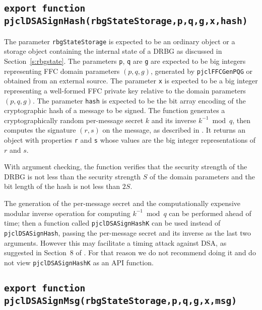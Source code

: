 \documentclass[12pt]{article}
\begin{document}
\subsection{\tt export function pjclDSASignHash(rbgStateStorage,p,q,g,x,hash)}

The parameter {\tt rbgStateStorage} is expected to be an ordinary
object or a storage object containing the internal state of a DRBG 
as discussed in Section~\ref{s:rbgstate}.
The parameters {\tt p}, {\tt q} are {\tt g}
are expected to be big integers representing FFC domain parameters $(p,q,g)$,
generated by {\tt pjclFFCGenPQG} or obtained from an external source.
The parameter {\tt x} is expected to be a big integer representing a 
well-formed FFC private key relative to the domain parameters $(p,q,g)$.
The parameter {\tt hash} is expected to be the bit array encoding of the
cryptographic hash of a message to be signed.  The function 
generates a cryptographically random per-message secret $k$ and its inverse $k^{-1} \bmod q$, then
computes the signature $(r,s)$ on the message,
as described in \cite[Section~4.6]{DSS-4}.
It returns an object
with properties {\tt r} and {\tt s} whose values are the big integer representations 
of $r$ and $s$.

With argument checking, the function verifies that the security strength of the DRBG
is not less than the security strength $S$ of the domain parameters and the 
bit length of the hash is not less than $2S$.

The generation of the per-message secret and 
the computationally expensive modular inverse operation for computing 
$k^{-1} \bmod q$ can be performed ahead of time; then a function called
{\tt pjclDSASignHashK} can be used instead of {\tt pjclDSASignHash},
passing the per-message secret and its inverse as the last two arguments.
However this may facilitate a timing
attack against DSA, as suggested in Section~8 of \cite{Kocher1996}.
For that reason we do not recommend doing it and do not view {\tt pjclDSASignHashK}
as an API function.

\subsection{\tt export function pjclDSASignMsg(rbgStateStorage,p,q,g,x,msg)}
\end{document}
